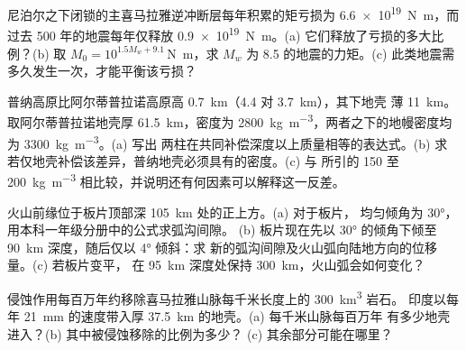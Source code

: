 \begin{exercise}[$\star\star$]\label{exo:b2:himalaya-andes:9}
尼泊尔之下闭锁的主喜马拉雅逆冲断层每年积累的矩亏损为
\qty{6.6e19}{N.m}，而过去 500 年的地震每年仅释放
\qty{0.9e19}{N.m}。(a) 它们释放了亏损的多大比例？(b) 取 $M_0 =
10^{1.5 M_w + 9.1}$\,\unit{N.m}，求 $M_w$
为 8.5 的地震的力矩。(c) 此类地震需多久发生一次，才能平衡该亏损？
\end{exercise}

\begin{exercise}[$\star\star\star$]\label{exo:b2:himalaya-andes:10}
普纳高原比阿尔蒂普拉诺高原高 \qty{0.7}{km}（4.4 对 \qty{3.7}{km}），其下地壳
薄 \qty{11}{km}。取阿尔蒂普拉诺地壳厚 \qty{61.5}{km}，密度为
\qty{2800}{kg.m^{-3}}，两者之下的地幔密度均为 \qty{3300}{kg.m^{-3}}。(a) 写出
两柱在共同补偿深度以上质量相等的表达式。(b) 求
若仅地壳补偿该差异，普纳地壳必须具有的密度。(c) 与
所引的 150 至 \qty{200}{kg.m^{-3}} 相比较，并说明还有何因素可以解释这一反差。
\end{exercise}

\begin{exercise}[$\star\star\star$]\label{exo:b2:himalaya-andes:11}
火山前缘位于板片顶部深 \qty{105}{km} 处的正上方。(a) 对于板片，
均匀倾角为 \ang{30}，用本科一年级分册中的公式求弧沟间隙。
(b) 板片现在先以 \ang{30} 的倾角下倾至 \qty{90}{km} 深度，随后仅以 \ang{4} 倾斜：求
新的弧沟间隙及火山弧向陆地方向的位移量。(c) 若板片变平，
在 \qty{95}{km} 深度处保持 \qty{300}{km}，火山弧会如何变化？
\end{exercise}

\begin{exercise}[$\star\star\star$]\label{exo:b2:himalaya-andes:12}
侵蚀作用每百万年约移除喜马拉雅山脉每千米长度上的 \qty{300}{km^3} 岩石。
印度以每年 \qty{21}{mm} 的速度带入厚 \qty{37.5}{km} 的地壳。(a) 每千米山脉每百万年
有多少地壳进入？(b) 其中被侵蚀移除的比例为多少？
(c) 其余部分可能在哪里？
\end{exercise}

